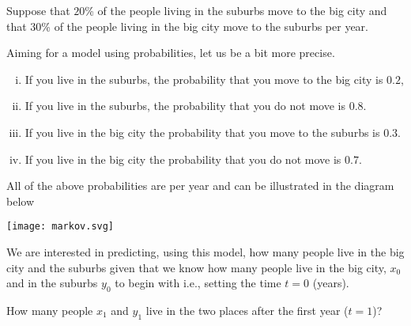 \documentclass{article}
\begin{document}
\begin{example}\label{eksstokmatr}


  Suppose that $20$\% of the people living in the suburbs move to the big city and
  that $30$\% of the people living in the big city move to the suburbs per year.

  Aiming for a model using probabilities, let us be a bit more precise.

\begin{enumerate}[(i)]
\item
  If you live in the suburbs, the probability that you move to the big city is $0.2$,
\item
  If you live in the suburbs, the probability that you do not move is $0.8$.
\item
  If you live in the big city the probability that you move to the suburbs is $0.3$.
\item
  If you live in the big city the probability that you do not move is $0.7$.
\end{enumerate}
All of the above probabilities are per year and can be illustrated in the diagram below

\texttt{[image: markov.svg]}

We are interested in predicting, using this model, how many people live
in the big city and the suburbs given that we know how many people
live in the big city, $x_0$ and in the suburbs $y_0$ to begin with i.e.,
setting the time $t = 0$ (years).

How many people $x_1$ and $y_1$ live in the two places after the first year ($t=1$)?


\end{example}
\end{document}
